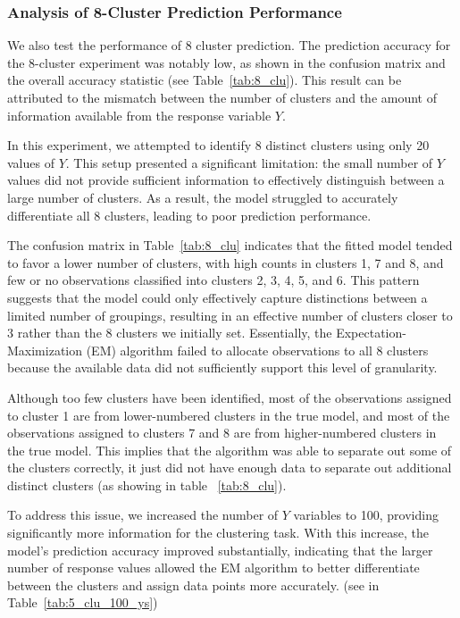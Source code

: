 \documentclass{article}
\begin{document}
\clearpage

\subsubsection{Analysis of 8-Cluster Prediction Performance}

We also test the performance of 8 cluster prediction.
The prediction accuracy for the 8-cluster experiment was notably low, as shown in the confusion matrix and the overall accuracy statistic (see Table~\ref{tab:8_clu}). This result can be attributed to the mismatch between the number of clusters and the amount of information available from the response variable \(Y\).

In this experiment, we attempted to identify 8 distinct clusters using only 20 values of \(Y\). This setup presented a significant limitation: the small number of \(Y\) values did not provide sufficient information to effectively distinguish between a large number of clusters. As a result, the model struggled to accurately differentiate all 8 clusters, leading to poor prediction performance.

The confusion matrix in Table~\ref{tab:8_clu} indicates that the fitted model tended to favor a lower number of clusters, with high counts in clusters 1, 7 and 8, and few or no observations classified into clusters 2, 3, 4, 5, and 6. This pattern suggests that the model could only effectively capture distinctions between a limited number of groupings, resulting in an effective number of clusters closer to 3 rather than the 8 clusters we initially set. Essentially, the Expectation-Maximization (EM) algorithm failed to allocate observations to all 8 clusters because the available data did not sufficiently support this level of granularity.

Although too few clusters have been identified, most of the observations assigned to cluster 1 are from lower-numbered clusters in the true model, and most of the observations assigned to clusters 7 and 8 are from higher-numbered clusters in the true model. This implies that the algorithm was able to separate out some of the clusters correctly, it just did not have enough data to separate out additional distinct clusters (as showing in table ~\ref{tab:8_clu}).

To address this issue, we increased the number of \(Y\) variables to 100, providing significantly more information for the clustering task. 
With this increase, the model's prediction accuracy improved substantially, indicating that the larger number of response values allowed the EM algorithm to better differentiate between the clusters and assign data points more accurately. (see in Table~\ref{tab:5_clu_100_ys})
\end{document}
